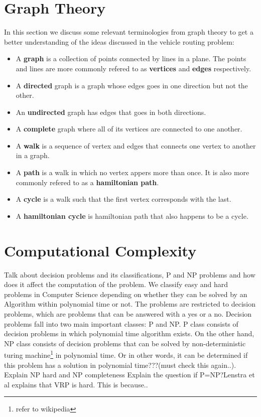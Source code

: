 \section{Graph Theory}
In this section we discuss some relevant terminologies \cite{wilson1996} from graph theory to get a better understanding of
the ideas discussed in the vehicle routing problem:
\begin{itemize}
\item A \textbf{graph} is a collection of points connected by lines in a plane. The points and lines are
more commonly refered to as \textbf{vertices} and \textbf{edges} respectively.
\item A \textbf{directed} graph is a graph whose edges goes in one direction but not the other.
\item An \textbf{undirected} graph has edges that goes in both directions.
\item A \textbf{complete} graph where all of its vertices are connected to one another.
\item A \textbf{walk} is a sequence of vertex and edges that connects one vertex to another in a graph.
\item A \textbf{path} is a walk in which no vertex appers more than once. It is also more commonly refered to as a \textbf{hamiltonian path}.
\item A \textbf{cycle} is a walk such that the first vertex corresponds with the last.
\item A \textbf{hamiltonian cycle} is hamiltonian path that also happens to be a cycle.
\end{itemize}

\section{Computational Complexity}
Talk about decision problems and its classifications, P and NP problems and how does it affect the computation of the problem.
We classify easy and hard problems in Computer Science depending on whether they can be solved by an Algorithm within polynomial time or not.
The problems are restricted to decision problems, which are problems that can be answered with a yes or a no. Decision problems fall into
two main important classes: P and NP. P class consists of decision problems in which polynomial time algorithm exists. On the other hand,
NP class consists of decision problems that can be solved by non-deterministic turing machine\footnote{refer to wikipedia} in polynomial time.
Or in other words, it can be determined if this problem has a solution in polynomial time???(must check this again..). Explain NP hard and
NP completeness
Explain the question if P=NP?Lenstra et al \cite{here} explains that VRP is hard. This is because..

